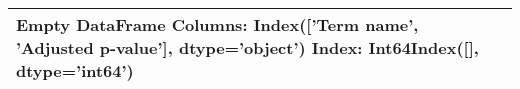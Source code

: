 \begin{tabular}{lr}
\toprule
Empty DataFrame
Columns: Index(['Term name', 'Adjusted p-value'], dtype='object')
Index: Int64Index([], dtype='int64') \\
\bottomrule
\end{tabular}
